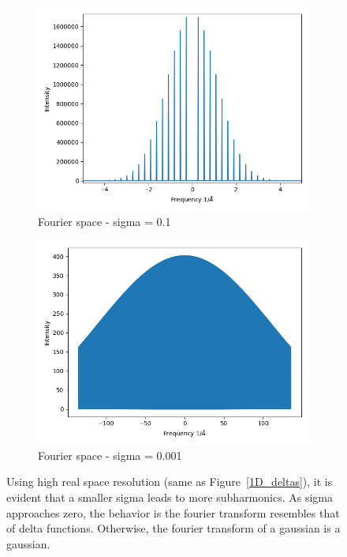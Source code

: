 \documentclass{article}
\begin{document}
\begin{figure}[h]
\begin{subfigure}{0.33\textwidth}
                \includegraphics[width=\textwidth]{fourier_gauss_1d_medsig}
                \caption{Fourier space - sigma = 0.1}\label{fourier_gauss_1d_medsig}
        \end{subfigure}
        \begin{subfigure}{0.33\textwidth}
                \centering
                \includegraphics[width=\textwidth]{fourier_gauss_1d_lowsig}
                \caption{Fourier space - sigma = 0.001}\label{fourier_gauss_1d_lowsig}
        \end{subfigure}
	\caption{Using high real space resolution (same as Figure~\ref{1D_deltas}), it
                 is evident that a smaller sigma leads to more subharmonics. As sigma
		 approaches zero, the behavior is the fourier transform resembles that
		 of delta functions. Otherwise, the fourier transform of a gaussian is
		 a gaussian.}\label{fig:1D_gauss_sigma}
\end{figure}
\end{document}
